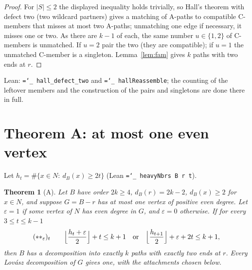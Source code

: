 \documentclass[11pt]{amsart}
\newtheorem{theorem}{Theorem}[section]
\theoremstyle{definition}
\newcommand{\lean}[1]{\texttt{\hyphenchar\font=`\_ #1}}
\begin{document}
\begin{proof}
For $|S|\le2$ the displayed inequality holds trivially, so Hall's theorem with defect two (two
wildcard partners) gives a matching of A-paths to compatible C-members that misses at most two
A-paths; unmatching one edge if necessary, it misses one or two. As there are $k-1$ of each, the
same number $u\in\{1,2\}$ of C-members is unmatched. If $u=2$ pair the two (they are compatible);
if $u=1$ the unmatched C-member is a singleton. Lemma~\ref{lem:fam} gives $k$ paths with two ends at
$r$.
\end{proof}

Lean: \lean{hall\_defect\_two} and \lean{hallReassemble}; the counting of the leftover members and the
construction of the pairs and singletons are done there in full.

\section{Theorem A: at most one even vertex}\label{sec:A}

Let $h_t=\#\{x\in N:\ d_B(x)\ge 2t\}$ (Lean \lean{heavyNbrs B r t}).

\begin{theorem}[A]\label{thm:A}
Let $B$ have order $2k\ge4$, $d_B(r)=2k-2$, $d_B(x)\ge2$ for $x\in N$, and suppose $G=B-r$ has at most
one vertex of positive even degree. Let $\varepsilon=1$ if some vertex of $N$ has even degree in $G$,
and $\varepsilon=0$ otherwise. If for every $3\le t\le k-1$
\[
(\ast\ast_\varepsilon)_t\qquad \Bigl\lfloor\frac{h_t+\varepsilon}{2}\Bigr\rfloor+t\le k+1
\quad\text{or}\quad
\Bigl\lfloor\frac{h_{t+1}}{2}\Bigr\rfloor+\varepsilon+2t\le k+1,
\]
then $B$ has a decomposition into exactly $k$ paths with exactly two ends at $r$. Every Lov\'asz
decomposition of $G$ gives one, with the attachments chosen below.
\end{theorem}
\end{document}
